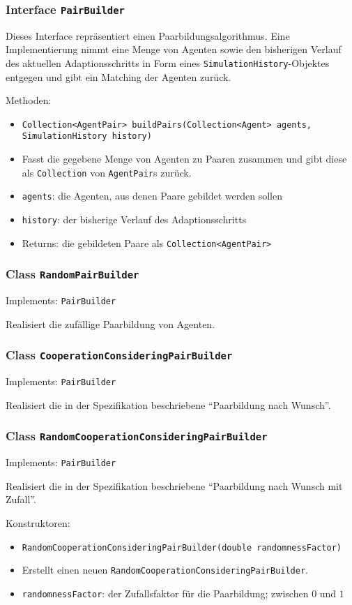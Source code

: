 \documentclass[parskip=full,11pt]{scrartcl}
\begin{document}
\subsubsection{Interface \texttt{PairBuilder}}
Dieses Interface repräsentiert einen Paarbildungsalgorithmus. Eine Implementierung nimmt eine Menge von Agenten sowie den bisherigen Verlauf des aktuellen Adaptionsschritts in Form eines \texttt{SimulationHistory}-Objektes entgegen und gibt ein Matching der Agenten zurück.

Methoden:
\begin{itemize}\itemsep -10pt
\item \texttt{Collection<AgentPair> buildPairs(Collection<Agent> agents, SimulationHistory history)}
\item[] Fasst die gegebene Menge von Agenten zu Paaren zusammen und gibt diese als \texttt{Collection} von \texttt{AgentPair}s zurück.
\item[] \texttt{agents}: die Agenten, aus denen Paare gebildet werden sollen
\item[] \texttt{history}: der bisherige Verlauf des Adaptionsschritts
\item[] Returns: die gebildeten Paare als \texttt{Collection<AgentPair>}
\end{itemize}

\subsubsection{Class \texttt{RandomPairBuilder}}
Implements: \texttt{PairBuilder}

Realisiert die zufällige Paarbildung von Agenten.

\subsubsection{Class \texttt{CooperationConsideringPairBuilder}}
Implements: \texttt{PairBuilder}

Realisiert die in der Spezifikation beschriebene \enquote{Paarbildung nach Wunsch}.

\subsubsection{Class \texttt{RandomCooperationConsideringPairBuilder}}
Implements: \texttt{PairBuilder}

Realisiert die in der Spezifikation beschriebene \enquote{Paarbildung nach Wunsch mit Zufall}.

Konstruktoren:
\begin{itemize}\itemsep -10pt
\item \texttt{RandomCooperationConsideringPairBuilder(double randomnessFactor)}
\item[] Erstellt einen neuen \texttt{RandomCooperationConsideringPairBuilder}.
\item[] \texttt{randomnessFactor}: der Zufallsfaktor für die Paarbildung; zwischen \(0\) und \(1\)
\end{itemize}
\end{document}
